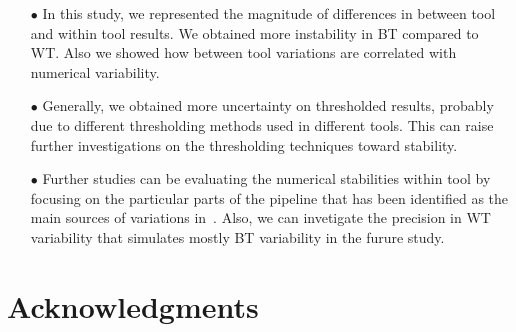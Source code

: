 \documentclass[conference]{IEEEtran}
\begin{document}
\begin{itemize}
    \item[$\bullet$ ] In this study, we represented the magnitude of differences in between tool and within tool results.
    We obtained more instability in BT compared to WT. Also we showed how between tool variations
    are correlated with numerical variability.

    \item[$\bullet$ ] Generally, we obtained more uncertainty on thresholded results, probably due to different thresholding
    methods used in different tools. This can raise further investigations on the thresholding techniques toward stability.

    \item[$\bullet$ ] Further studies can be evaluating the numerical stabilities within tool by focusing on the particular parts of
    the pipeline that has been identified as the main sources of variations in~\cite{bowring2021isolating}.
    Also, we can invetigate the precision in WT variability that simulates mostly BT variability in the furure study.

\end{itemize}


\section{Acknowledgments}




\end{document}
